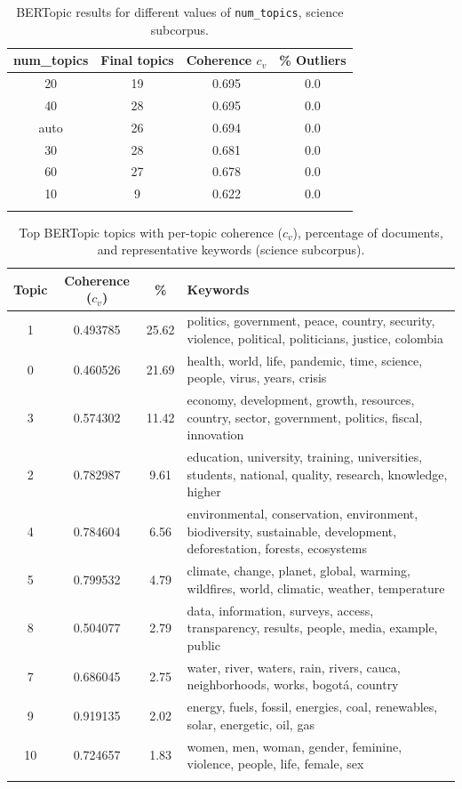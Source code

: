 \documentclass[pdflatex,sn-mathphys-num, iicol]{sn-jnl}
\begin{document}
	
	\begin{table}[h!]
		\caption{BERTopic results for different values of \texttt{num\_topics}, science subcorpus.}
		\label{tab:bertopic_nr_topics_ciencia}
		\centering
		\footnotesize
		\begin{tabular}{@{}cccc@{}}
			\toprule
			\textbf{num\_topics} & \textbf{Final topics} & \textbf{Coherence $c_v$} & \textbf{\% Outliers} \\
			\midrule
			20   & 19 & 0.695 & 0.0 \\
			40   & 28 & 0.695 & 0.0 \\
			auto & 26 & 0.694 & 0.0 \\
			30   & 28 & 0.681 & 0.0 \\
			60   & 27 & 0.678 & 0.0 \\
			10   & 9  & 0.622 & 0.0 \\
			\botrule
		\end{tabular}
	\end{table}
	
	
	\begin{table}[h!]
		\caption{Top BERTopic topics with per-topic coherence ($c_v$), percentage of documents, and representative keywords (science subcorpus).}
		\label{tab:topics_ciencia}
		\begin{tabularx}{\textwidth}{@{}cccX@{}}
			\toprule
			\textbf{Topic} & \textbf{Coherence ($c_v$)} & \textbf{\%} & \textbf{Keywords} \\
			\midrule
			1  & 0.493785 & 25.62 & politics, government, peace, country, security, violence, political, politicians, justice, colombia \\
			0  & 0.460526 & 21.69 & health, world, life, pandemic, time, science, people, virus, years, crisis \\
			3  & 0.574302 & 11.42 & economy, development, growth, resources, country, sector, government, politics, fiscal, innovation \\
			2  & 0.782987 & 9.61  & education, university, training, universities, students, national, quality, research, knowledge, higher \\
			4  & 0.784604 & 6.56  & environmental, conservation, environment, biodiversity, sustainable, development, deforestation, forests, ecosystems \\
			5  & 0.799532 & 4.79  & climate, change, planet, global, warming, wildfires, world, climatic, weather, temperature \\
			8  & 0.504077 & 2.79  & data, information, surveys, access, transparency, results, people, media, example, public \\
			7  & 0.686045 & 2.75  & water, river, waters, rain, rivers, cauca, neighborhoods, works, bogotá, country \\
			9  & 0.919135 & 2.02  & energy, fuels, fossil, energies, coal, renewables, solar, energetic, oil, gas \\
			10 & 0.724657 & 1.83  & women, men, woman, gender, feminine, violence, people, life, female, sex \\
			\botrule
		\end{tabularx}
	\end{table}
	
\end{document}
